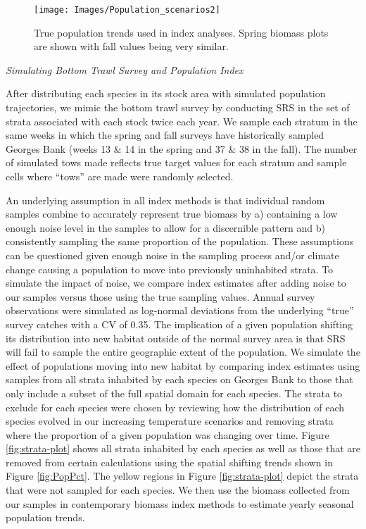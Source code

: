 \documentclass[
  12pt,
]{article}
\begin{document}
\begin{figure}

{\centering \texttt{[image: Images/Population\_scenarios2]} 

}

\caption{True population trends used in index analyses. Spring biomass plots are shown with fall values being very similar.}\label{fig:pop-scenarios}
\end{figure}

\emph{Simulating Bottom Trawl Survey and Population Index}

After distributing each species in its stock area with simulated population trajectories, we mimic the bottom trawl survey by conducting SRS in the set of strata associated with each stock twice each year. We sample each stratum in the same weeks in which the spring and fall surveys have historically sampled Georges Bank (weeks 13 \& 14 in the spring and 37 \& 38 in the fall). The number of simulated tows made reflects true target values for each stratum and sample cells where ``tows'' are made were randomly selected.

An underlying assumption in all index methods is that individual random samples combine to accurately represent true biomass by a) containing a low enough noise level in the samples to allow for a discernible pattern and b) consistently sampling the same proportion of the population. These assumptions can be questioned given enough noise in the sampling process and/or climate change causing a population to move into previously uninhabited strata. To simulate the impact of noise, we compare index estimates after adding noise to our samples versus those using the true sampling values. Annual survey observations were simulated as log-normal deviations from the underlying ``true'' survey catches with a CV of 0.35. The implication of a given population shifting its distribution into new habitat outside of the normal survey area is that SRS will fail to sample the entire geographic extent of the population. We simulate the effect of populations moving into new habitat by comparing index estimates using samples from all strata inhabited by each species on Georges Bank to those that only include a subset of the full spatial domain for each species. The strata to exclude for each species were chosen by reviewing how the distribution of each species evolved in our increasing temperature scenarios and removing strata where the proportion of a given population was changing over time. Figure \ref{fig:strata-plot} shows all strata inhabited by each species as well as those that are removed from certain calculations using the spatial shifting trends shown in Figure \ref{fig:PopPct}. The yellow regions in Figure \ref{fig:strata-plot} depict the strata that were not sampled for each species. We then use the biomass collected from our samples in contemporary biomass index methods to estimate yearly seasonal population trends.
\end{document}
